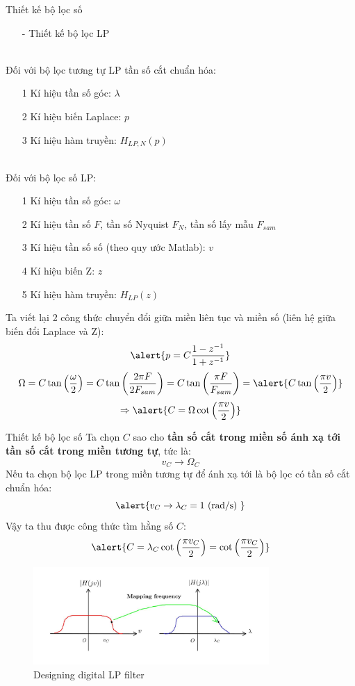 \documentclass[8pt]{beamer}
\begin{document}
\begin{frame}{Thiết kế bộ lọc số}
\begin{itemize}
	\item[-] Thiết kế bộ lọc LP
\end{itemize}
\\ Đối với bộ lọc tương tự LP \alert{tần số cắt chuẩn hóa}:
\begin{enumerate}
	\item[1] Kí hiệu tần số góc: $\lambda$
	\item[2] Kí hiệu biến Laplace: $p$
	\item[3] Kí hiệu hàm truyền: $H_{LP,N}(p)$
\end{enumerate}

\\ Đối với bộ lọc số LP:
\begin{enumerate}
	\item[1] Kí hiệu tần số góc: $\omega$
	\item[2] Kí hiệu tần số $F$, tần số Nyquist $F_{N}$, tần số lấy mẫu $F_{sam}$
	\item[3] Kí hiệu tần số số (theo quy ước Matlab): $v$
	\item[4] Kí hiệu biến Z: $z$
	\item[5] Kí hiệu hàm truyền: $H_{LP}(z)$
\end{enumerate}
Ta viết lại 2 công thức chuyển đổi giữa miền liên tục và miền số (liên hệ giữa biến đổi Laplace và Z):
$$\alert{p=C\frac{1-z^{-1}}{1+z^{-1}}}$$
$$\Omega=C\tan\left(\frac{\omega}{2}\right)=C\tan{\left(\frac{2\pi F}{2F_{sam}}\right)}=C\tan{\left(\frac{\pi F}{F_{sam}}\right)}=\alert{C\tan{\left(\frac{\pi v}{2}\right)}}$$
$$\Rightarrow \alert{C=\Omega\cot{\left(\frac{\pi v}{2}\right)}}$$
\end{frame}
\begin{frame}{Thiết kế bộ lọc số}
Ta chọn $C$ sao cho \textbf{tần số cắt trong miền số ánh xạ tới tần số cắt trong miền tương tự}, tức là: $$v_{C}\to\Omega_{C}$$
Nếu ta chọn bộ lọc LP trong miền tương tự để ánh xạ tới là bộ lọc có tần số cắt chuẩn hóa:
$$\alert{v_{C}\to\lambda_{C}=1\text{ (rad/s) }}$$
Vậy ta thu được công thức tìm hằng số $C$:
$$\alert{C=\lambda_{C}\cot{\left(\frac{\pi v_{C}}{2}\right)}=\cot{\left(\frac{\pi v_{C}}{2}\right)}}$$
\begin{figure}[h]
	\includegraphics[width=0.8\textwidth]{26.jpg}
	\caption{Designing digital LP filter}			\label{fig:re2}
		\end{figure}


\end{frame}
\end{document}
